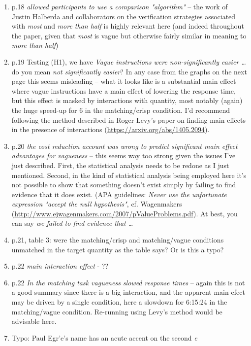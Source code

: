 \documentclass{tufte-handout}
\begin{document}
\begin{enumerate}
\item p.18 \emph{allowed participants to use a comparison "algorithm"} -- the work of Justin Halberda and collaborators on the verification strategies associated with \emph{most} and \emph{more than half} is highly relevant here (and indeed throughout the paper, given that \emph{most} is vague but otherwise fairly similar in meaning to \emph{more than half})

\item p.19 Testing (H1), we have \emph{Vague instructions were non-significantly easier \ldots} do you mean \emph{not significantly easier}? In any case from the graphs on the next page this seems misleading -- what it looks like is a substantial main effect where vague instructions have a main effect of lowering the response time, but this effect is masked by interactions with quantity, most notably (again) the huge speed-up for 6 in the matching/crisp condition. I'd recommend following the method described in Roger Levy's paper on finding main effects in the presence of interactions (\url{https://arxiv.org/abs/1405.2094}).

\item p.20 \emph{the cost reduction account was wrong to predict significant main effect advantages for vagueness} -- this seems way too strong given the issues I've just described. First, the statistical analysis needs to be redone as I just mentioned. Second, in the kind of statistical analysis being employed here it's not possible to show that something doesn't exist simply by failing to find evidence that it does exist. (APA guidelines: \emph{Never use the unfortunate expression "accept the null hypothesis"}, cf. Wagenmakers (\url{http://www.ejwagenmakers.com/2007/pValueProblems.pdf}). At best, you can say \emph{we failed to find evidence that \ldots}

\item p.21, table 3: were the matching/crisp and matching/vague conditions unmatched in the target quantity as the table says? Or is this a typo?

\item p.22 \emph{main interaction effect} - ??

\item p.22 \emph{In the matching task vagueness slowed response times} -- again this is not a good summary since there is a big interaction, and the apparent main efect may be driven by a single condition, here a slowdown for 6:15:24 in the matching/vague condition. Re-running using Levy's method would be advisable here.

\item Typo: Paul Egr\a'e's name has an acute accent on the second \emph{e}

\end{enumerate}
\end{document}
